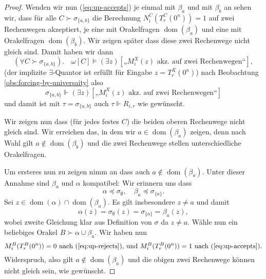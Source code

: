 \documentclass[nofonts]{uebung}
\theoremstyle{definition}
\DeclareMathOperator{\dom}{dom}
\begin{document}
\begin{proof}
    Wenden wir nun (\ref{eq:up-accepts}) je einmal mit $\beta_a$ und mit $\beta_b$ an sehen wir, dass
    für alle $C\succ \sigma_{\{a,b\}}$ die Berechnung $N^C_i(T^C_r(0^n))=1$ auf zwei Rechenwegen akzeptiert, je eine mit Orakelfragen $\dom(\beta_a)$ und eine mit Orakelfragen $\dom(\beta_b)$. Wir zeigen später dass diese zwei Rechenwege nicht gleich sind. Damit haben wir dann 
    \[ (\forall C\succ \sigma_{\{a,b\}}).\quad\omega[C]\vDash(\exists z)[\text{„$M_i^X(z)$ akz. auf zwei Rechenwegen“}], \]
    (der implizite $\exists$-Quantor ist erfüllt für Eingabe $z=T_r^X(0^n)$)
    nach Beobachtung \ref{obs:forcing-by-universaity} also
    \[ \sigma_{\{a,b\}} \Vdash(\exists z)[\text{„$M_i^X(z)$ akz. auf zwei Rechenwegen“}] \]
    und damit ist mit $\tau=\sigma_{\{a,b\}}$ auch $\tau\Vdash   R_{i,r}$ wie gewünscht.

    Wir zeigen nun dass (für jedes festes $C$) die beiden oberen Rechenwege nicht gleich sind. 
    Wir erreichen das, in dem wir $a\in\dom(\beta_a)$ zeigen, denn nach Wahl gilt $a\not\in\dom(\beta_b)$ und die zwei Rechenwege stellen unterschiedliche Orakelfragen.

    Um ersteres nun zu zeigen nimm an dass auch $a\not\in\dom(\beta_a)$.
    Unter dieser Annahme sind $\beta_a$ und $\alpha$ kompatibel:
    Wir erinnern uns dass 
    \[ \alpha\preceq\sigma_\emptyset, \quad \beta_a\preceq\sigma_{\{a\}}. \]
    Sei $z\in\dom(\alpha)\cap\dom(\beta_a)$. Es gilt insbesondere $z\neq a$ und damit
    \[ \alpha(z)=\sigma_\emptyset(z)=\sigma_{\{a\}}=\beta_a(z), \]
    wobei zweite Gleichung klar aus Definition von $\sigma$ da $z\neq a$.
    Wähle nun ein beliebiges Orakel $B\succ\alpha\cup\beta_a$.
    Wir haben nun 
    \[ M_i^B(T_r^B(0^n))=0 \text{ nach (\ref{eq:up-rejects}), und } M_i^B(T_r^B(0^n))=1 \text{ nach (\ref{eq:up-accepts}).} \]
    Widerspruch, also gilt $a\not\in\dom(\beta_a)$ und die obigen zwei Rechenwege können nicht gleich sein, wie gewünscht.
\end{proof}
\end{document}
